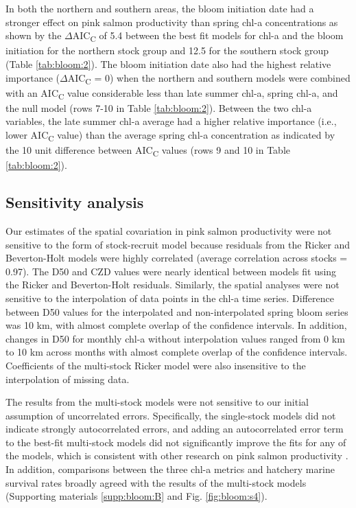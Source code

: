 In both the northern and southern areas, the bloom initiation date had a
stronger effect on pink salmon productivity than spring chl-a concentrations as
shown by the \(\Delta\)AIC\textsubscript{C} of 5.4 between the best fit models
for chl-a and the bloom initiation for the northern stock group and 12.5 for the
southern stock group (Table \ref{tab:bloom:2}).  The bloom initiation date also had the highest
relative importance (\(\Delta\)AIC\textsubscript{C} = 0) when the northern and
southern models were combined with an AIC\textsubscript{C} value considerable
less than late summer chl-a, spring chl-a, and the null model (rows 7-10 in
Table \ref{tab:bloom:2}). Between the two chl-a variables, the late summer chl-a average had a
higher relative importance (i.e., lower AIC\textsubscript{C} value) than the
average spring chl-a concentration as indicated by the 10 unit difference
between AIC\textsubscript{C} values (rows 9 and 10 in Table \ref{tab:bloom:2}).

\subsection{Sensitivity analysis}

Our estimates of the spatial covariation in pink salmon productivity were not
sensitive to the form of stock-recruit model because residuals from the Ricker
and Beverton-Holt models were highly correlated (average correlation across
stocks = 0.97). The D50 and CZD values were nearly identical between models fit
using the Ricker and Beverton-Holt residuals. Similarly, the spatial analyses
were not sensitive to the interpolation of data points in the chl-a time series.
Difference between D50 values for the interpolated and non-interpolated spring
bloom series was 10 km, with almost complete overlap of the confidence
intervals. In addition, changes in D50 for monthly chl-a without interpolation
values ranged from 0 km to 10 km across months with almost complete overlap of
the confidence intervals. Coefficients of the multi-stock Ricker model were also
insensitive to the interpolation of missing data.

The results from the multi-stock models were not sensitive to our initial
assumption of uncorrelated errors. Specifically, the single-stock models did not
indicate strongly autocorrelated errors, and adding an autocorrelated error term
to the best-fit multi-stock models did not significantly improve the fits for
any of the models, which is consistent with other research on pink salmon
productivity \citep{Pyper2001a}. In addition, comparisons between the three
chl-a metrics and hatchery marine survival rates broadly agreed with the results
of the multi-stock models (Supporting materials \ref{supp:bloom:B} and Fig. \ref{fig:bloom:s4}).

